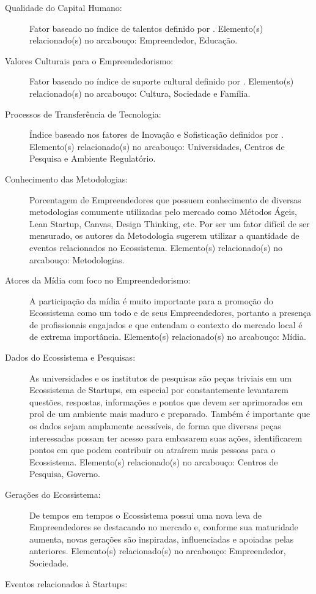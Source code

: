 \begin{description}
  \item [Qualidade do Capital Humano:] Fator baseado no índice de talentos definido por . Elemento(s) relacionado(s) no arcabouço: Empreendedor, Educação.

  \item [Valores Culturais para o Empreendedorismo:] Fator baseado no índice de suporte cultural definido por . Elemento(s) relacionado(s) no arcabouço: Cultura, Sociedade e Família.

  \item [Processos de Transferência de Tecnologia:] Índice baseado nos fatores de Inovação e Sofisticação definidos por . Elemento(s) relacionado(s) no arcabouço: Universidades, Centros de Pesquisa e Ambiente Regulatório.

  \item [Conhecimento das Metodologias:] Porcentagem de Empreendedores que possuem conhecimento de diversas metodologias comumente utilizadas pelo mercado como Métodos Ágeis, Lean Startup, Canvas, Design Thinking, etc. Por ser um fator difícil de ser mensurado, os autores da Metodologia sugerem utilizar a quantidade de eventos relacionados no Ecossistema. Elemento(s) relacionado(s) no arcabouço: Metodologias.

  \item [Atores da Mídia com foco no Empreendedorismo:] A participação da mídia é muito importante para a promoção do Ecossistema como um todo e de seus Empreendedores, portanto a presença de profissionais engajados e que entendam o contexto do mercado local é de extrema importância. Elemento(s) relacionado(s) no arcabouço: Mídia.

  \item [Dados do Ecossistema e Pesquisas:] As universidades e os institutos de pesquisas são peças triviais em um Ecossistema de Startups, em especial por constantemente levantarem questões, respostas, informações e pontos que devem ser aprimorados em prol de um ambiente mais maduro e preparado. Também é importante que os dados sejam amplamente acessíveis, de forma que diversas peças interessadas possam ter acesso para embasarem suas ações, identificarem pontos em que podem contribuir ou atraírem mais pessoas para o Ecossistema. Elemento(s) relacionado(s) no arcabouço: Centros de Pesquisa, Governo.
  
  \item [Gerações do Ecossistema:] De tempos em tempos o Ecossistema possui uma nova leva de Empreendedores se destacando no mercado e, conforme sua maturidade aumenta, novas gerações são inspiradas, influenciadas e apoiadas pelas anteriores. Elemento(s) relacionado(s) no arcabouço: Empreendedor, Sociedade.  

  \item [Eventos relacionados à Startups:]     
\end{description}

